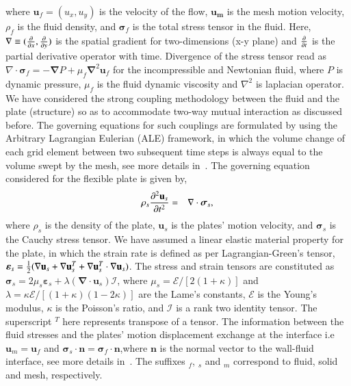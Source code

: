 \documentclass[final,3p,times,authoryear]{elsarticle}
\begin{document}
	where $\mathbf{u}_f=(u_x,u_y)$ is the velocity of the flow, $\mathbf{u_m}$ is the mesh motion velocity, $\rho_f$ is the fluid density, and $\boldsymbol{\sigma}_f$ is the total stress tensor in the fluid. Here, $\mathbf{\nabla}\equiv ({\partial\over\partial x},{\partial\over\partial y})$ is the spatial gradient for two-dimensions (x-y plane) and ${\partial\over\partial t}$ is the partial derivative operator with time.	Divergence of the stress tensor read as $\nabla\cdot\boldsymbol{\sigma}_f=-\mathbf{\nabla}P+\mu_f\mathbf{\nabla}^2\mathbf{u}_f$ for the incompressible and Newtonian fluid, where $P$ is dynamic pressure, $\mu_f$ is the fluid dynamic viscosity and $\nabla^2$ is laplacian operator. We have considered the strong coupling methodology between the fluid and the plate (structure) so as to accommodate two-way mutual interaction as discussed before. The governing equations for such couplings are formulated by using the Arbitrary Lagrangian Eulerian (ALE) framework, in which the volume change of each grid element between two subsequent time steps is always equal to the volume swept by the mesh, see more details in~\citep{Nguyen2010, Slone2002, CampbellPaterson2011}.  %
	The governing equation considered for the flexible plate is given by,	
	\begin{eqnarray}
		\rho_s{\partial^2\mathbf{u}_s\over\partial t^2} &=& \mathbf{\nabla}\cdot\mathbf{\boldsymbol{\sigma}}_s,
	\end{eqnarray}
	where $\rho_s$ is the density of the plate, $\mathbf{u}_s$ is the plates' motion velocity, and $\mathbf{\boldsymbol{\sigma}}_s$ is the Cauchy stress tensor. We have assumed a linear elastic material property for the plate, in which the strain rate is defined as per Lagrangian-Green's tensor, $\boldsymbol{\varepsilon}_s={1\over2}(\mathbf{\nabla}\mathbf{u}_s+\mathbf{\nabla}\mathbf{u}_s^T+\mathbf{\nabla}\mathbf{u}_s^T \cdot \mathbf{\nabla}\mathbf{u}_s)$. The stress and strain tensors are constituted as $\boldsymbol{\sigma}_s=2\mu_s \boldsymbol{\varepsilon}_s+\lambda( \mathbf{\nabla}\cdot\mathbf{u}_s)\mathcal{I}$, where $\mu_s=\mathcal{E}/[2(1+\kappa)]$ and $\lambda=\kappa \mathcal{E}/[(1+\kappa)(1-2\kappa)]$ are the Lame's constants, $\mathcal{E}$ is the Young's modulus, $\kappa$ is the Poisson's ratio,  and $\mathcal{I}$ is a rank two identity tensor. The superscript $^T$ here represents transpose of a tensor. The information between the fluid stresses and the plates' motion displacement exchange at the interface i.e $\mathbf{u}_m=\mathbf{u}_f$ and $\boldsymbol{\sigma}_s\cdot\mathbf{n}=\boldsymbol{\sigma}_f\cdot\mathbf{n}$,where $\mathbf{n}$ is the normal vector to the wall-fluid interface, see more details in~\citep{CasadeiHalleux1995, Casadei2001}. The suffixes $_f$, $_s$ and $_m$ correspond to fluid, solid and mesh, respectively.
\end{document}
